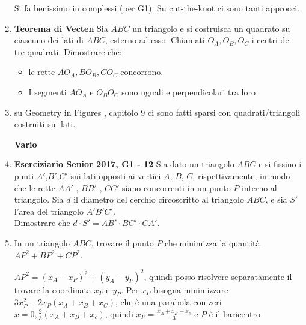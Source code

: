 \begin{enumerate}
\begin{sol}
Si fa benissimo in complessi (per G1). Su cut-the-knot ci sono tanti approcci.\cite{napoleoncomplex}
\end{sol}
            
\item \textbf{Teorema di Vecten } Sia $ABC$ un triangolo e si costruisca un quadrato su ciascuno dei lati di $ABC$, esterno ad esso. Chiamati $O_A,O_B,O_C$ i centri dei tre quadrati. Dimostrare che:
\begin{itemize}
 \item le rette $AO_A,BO_B,CO_C$ concorrono.
 \item I segmenti $AO_A$ e $O_BO_C$ sono uguali e perpendicolari tra loro
\end{itemize}

\item su Geometry in Figures \cite{engeofigures}, capitolo 9 ci sono fatti sparsi con quadrati/triangoli costruiti sui lati.


\textbf{Vario}




\item \textbf{Eserciziario Senior 2017, G1 - 12} Sia dato un triangolo $ABC$ e si fissino i punti $A'$,$B'$,$C'$ sui lati opposti ai vertici $A$, $B$,
$C$, rispettivamente, in modo che le rette $AA'$ , $BB'$ , $CC'$ siano concorrenti in un punto $P$ interno al triangolo. Sia $d$ il diametro del cerchio circoscritto al triangolo $ABC$, e sia $S'$ l’area del triangolo $A'B'C'$.\\
Dimostrare che $d \cdot S' = AB'\cdot BC'\cdot CA'$.

\item In un triangolo $ABC$, trovare il punto $P$ che minimizza la quantità $AP^2+BP^2+CP^2$.

\begin{sol}
 $AP^2=(x_A-x_P)^2+(y_A-y_P)^2$, quindi posso risolvere separatamente il trovare la coordinata $x_P$ e $y_P$. 
 Per $x_P$ bisogna minimizzare $3x_P^2-2x_P(x_A+x_B+x_C)$, che è una parabola con zeri $x=0, \frac{2}{3}(x_A+x_B+x_c)$, quindi $x_P=\frac{x_A+x_B+x_c}{3}$ e $P$ è il baricentro
\end{sol}

\end{enumerate}


